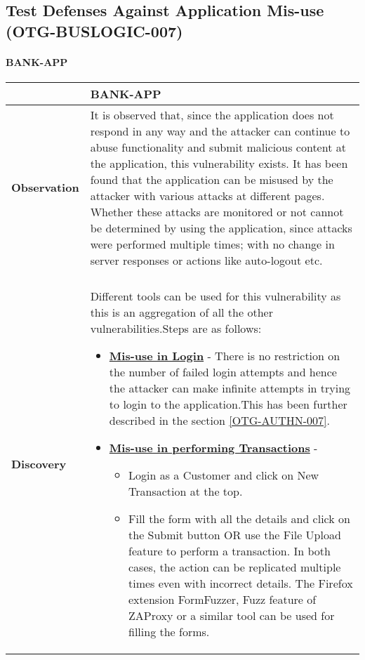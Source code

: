 \subsection{Test Defenses Against Application Mis-use (OTG-BUSLOGIC-007)}

\paragraph{BANK-APP} \mbox{}
\begin{longtable*}{p{.20\textwidth} | p{.80\textwidth}}
    \hline
    & \textbf{BANK-APP} \\
    \hline
    \textbf{Observation} &
	  It is observed that, since the application does not respond in any way and the attacker can continue to abuse functionality and submit malicious content at the application, this vulnerability exists.
	  It has been found that the application can be misused by the attacker with various attacks at different pages. Whether these attacks are monitored or not cannot be determined by using the application, since attacks were performed multiple times; with no change in server responses or actions like auto-logout etc.
    \\\\
    \textbf{Discovery} &
      Different tools can be used for this vulnerability as this is an aggregation of all the other vulnerabilities.Steps are as follows:
      \begin{itemize}
	      \item \underline{\textbf{Mis-use in Login}} - There is no restriction on the number of failed login attempts and hence the attacker can make infinite attempts in trying to login to the application.This has been further described in the section \ref{OTG-AUTHN-007}.
	      
	      \item \underline{\textbf{Mis-use in performing Transactions}} -
	      	\begin{itemize}
	      		\item  Login as a Customer and click on New Transaction at the top.
	      		
	      		\item Fill the form with all the details and click on the Submit button OR use the File Upload feature to perform a transaction. In both cases, the action can be replicated multiple times even with incorrect details. The Firefox extension FormFuzzer, Fuzz feature of ZAProxy or a similar tool can be used for filling the forms.
	      	\end{itemize}
	      	

\end{itemize}
\end{longtable*}
